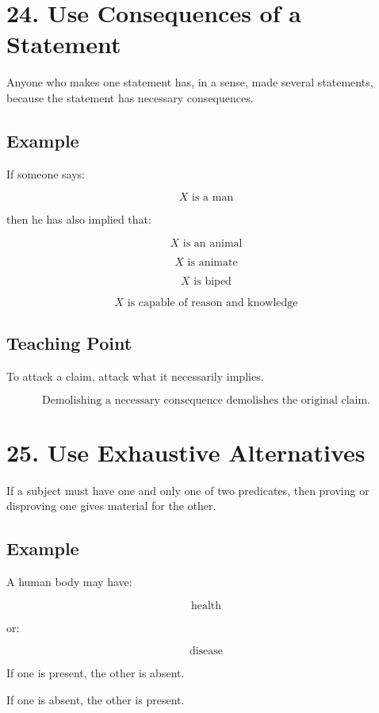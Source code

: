 \documentclass[12pt]{article}
\begin{document}
\section*{24. Use Consequences of a Statement}

Anyone who makes one statement has, in a sense, made several statements,
because the statement has necessary consequences.

\subsection*{Example}

If someone says:

\[
X \text{ is a man}
\]

then he has also implied that:

\[
X \text{ is an animal}
\]

\[
X \text{ is animate}
\]

\[
X \text{ is biped}
\]

\[
X \text{ is capable of reason and knowledge}
\]

\subsection*{Teaching Point}

To attack a claim, attack what it necessarily implies.

\[
\boxed{
\text{Demolishing a necessary consequence demolishes the original claim.}
}
\]

\section*{25. Use Exhaustive Alternatives}

If a subject must have one and only one of two predicates, then proving or
disproving one gives material for the other.

\subsection*{Example}

A human body may have:

\[
\text{health}
\]

or:

\[
\text{disease}
\]

If one is present, the other is absent.

If one is absent, the other is present.
\end{document}
